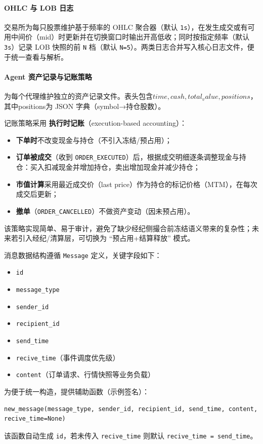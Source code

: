 \paragraph{OHLC 与 LOB 日志}
交易所为每只股票维护基于频率的 OHLC 聚合器（默认 \verb|1s|），在发生成交或有可用中间价（mid）时更新并在切换窗口时输出开高低收；同时按指定频率（默认 \verb|3s|）记录 LOB 快照的前 \verb|N| 档（默认 \verb|N=5|）。两类日志合并写入核心日志文件，便于统一查看与解析。

\paragraph{Agent 资产记录与记账策略}
为每个代理维护独立的资产记录文件。表头包含$time,cash,total_value,positions$，其中positions为 JSON 字典（symbol→持仓股数）。

记账策略采用 \textbf{执行时记账}（execution-based accounting）：
\begin{itemize}
  \item \textbf{下单时}不改变现金与持仓（不引入冻结/预占用）；
  \item \textbf{订单被成交}（收到 \verb|ORDER_EXECUTED|）后，根据成交明细逐条调整现金与持仓：买入扣减现金并增加持仓，卖出增加现金并减少持仓；
  \item \textbf{市值计算}采用最近成交价（last price）作为持仓的标记价格（MTM），在每次成交后更新；
  \item \textbf{撤单}（\verb|ORDER_CANCELLED|）不做资产变动（因未预占用）。
\end{itemize}

该策略实现简单、易于审计，避免了缺少经纪侧撮合前冻结语义带来的复杂性；未来若引入经纪/清算层，可切换为 “预占用+结算释放” 模式。

消息数据结构遵循 \texttt{Message} 定义，关键字段如下：
\begin{itemize}
  \item \texttt{id}
  \item \texttt{message\_type}
  \item \texttt{sender\_id}
  \item \texttt{recipient\_id}
  \item \texttt{send\_time}
  \item \texttt{recive\_time}（事件调度优先级）
  \item \texttt{content}（订单请求、行情快照等业务负载）
\end{itemize}

为便于统一构造，提供辅助函数（示例签名）：
\begin{verbatim}
new_message(message_type, sender_id, recipient_id, send_time, content, recive_time=None)
\end{verbatim}
该函数自动生成 \texttt{id}，若未传入 \texttt{recive\_time} 则默认 \texttt{recive\_time = send\_time}。


